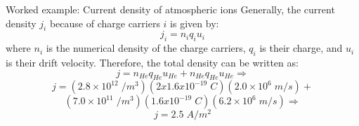 {\begin{frame}{Worked example: Current density of atmospheric ions}
  Generally, the current density $j_i$ because of charge carriers $i$ is given by:
  \begin{equation*}
    j_i = n_i q_i u_i
  \end{equation*}
  where $n_i$ is the numerical density of the charge carriers,
  $q_i$ is their charge, and $u_i$ is their drift velocity.
  Therefore, the total density can be written as:
  \begin{equation*}
    j = n_{He} q_{He} u_{He} + n_{He} q_{He} u_{He} \Rightarrow
  \end{equation*}
  \vspace{0.1cm}
  \begin{equation*}
    j = (2.8 \times 10^{12} \; /m^3) (2 x 1.6 x 10^{-19} \; C) (2.0 \times 10^{6} \; m/s) +
  \end{equation*}
  \begin{equation*}
        (7.0 \times 10^{11} \; /m^3) (1.6 x 10^{-19} \; C) (6.2 \times 10^{6} \; m/s)\Rightarrow
  \end{equation*}
  \vspace{0.1cm}
  \begin{equation*}
    j = 2.5 \; A/m^2
  \end{equation*}

\end{frame}

} %



%
%

